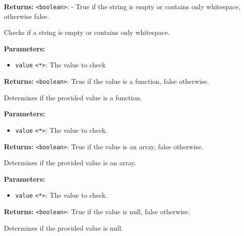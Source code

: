 \documentclass[12pt,a4paper]{article}
\begin{document}
\noindent \textbf{Returns:} \texttt{<boolean>}: - True if the string is empty or contains only whitespace, otherwise false.

\noindent Checks if a string is empty or contains only whitespace.

\vspace{5mm}
\noindent {}


\noindent \textbf{Parameters:}
\begin{itemize}
  \item \texttt{value} \texttt{<*>}: The value to check
\end{itemize}

\noindent \textbf{Returns:} \texttt{<boolean>}: True if the value is a function, false otherwise.

\noindent Determines if the provided value is a function.

\vspace{5mm}
\noindent {}


\noindent \textbf{Parameters:}
\begin{itemize}
  \item \texttt{value} \texttt{<*>}: The value to check.
\end{itemize}

\noindent \textbf{Returns:} \texttt{<boolean>}: True if the value is an array, false otherwise.

\noindent Determines if the provided value is an array.

\vspace{5mm}
\noindent {}


\noindent \textbf{Parameters:}
\begin{itemize}
  \item \texttt{value} \texttt{<*>}: The value to check.
\end{itemize}

\noindent \textbf{Returns:} \texttt{<boolean>}: True if the value is null, false otherwise.

\noindent Determines if the provided value is null.
\end{document}
